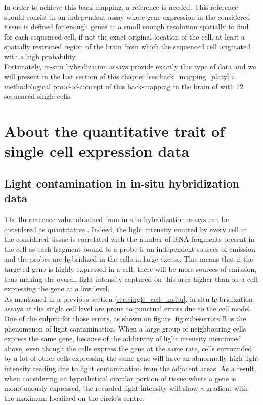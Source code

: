 	In order to achieve this back-mapping, a reference is needed. This reference should consist in an independent assay where gene expression in the considered tissue is defined for enough genes at a small enough resolution spatially to find for each sequenced cell, if not the exact original location of the cell, at least a spatially restricted region of the brain from which the sequenced cell originated with a high probability.\\
	
	Fortunately, in-situ hybridization assays provide exactly this type of data and we will present in the last section of this chapter \ref{sec:back_mapping_platy} a methodological proof-of-concept of this back-mapping in the brain of \platy{} with 72 sequenced single cells.

\section{About the quantitative trait of single cell expression data}\label{sec:quantitative_single_cell}
  \subsection*{Light contamination in in-situ hybridization data}
  The fluorescence value obtained from in-situ hybridization assays can be considered as quantitative \cite{dorresteijn90}. Indeed, the light intensity emitted by every cell in the considered tissue is correlated with the number of RNA fragments present in the cell as each fragment bound to a probe is an independent sources of emission and the probes are hybridized in the cells in large excess. This means that if the targeted gene is highly expressed in a cell, there will be more sources of emission, thus making the overall light intensity captured on this area higher than on a cell expressing the gene at a low level. \\
  
  As mentioned in a previous section \ref{sec:single_cell_insitu}, in-situ hybridization assays at the single cell level are prone to punctual errors due to the cell model. One of the culprit for those errors, as shown on figure \ref{fig:cubeserrors}B is the phenomenon of light contamination. When a large group of neighbouring cells express the same gene, because of the additivity of light intensity mentioned above, even though the cells express the gene at the same rate, cells surrounded by a lot of other cells expressing the same gene will have an abnormally high light intensity reading due to light contamination from the adjacent areas. As a result, when considering an hypothetical circular portion of tissue where a gene is monotonously expressed, the recorded light intensity will show a gradient with the maximum localized on the circle's centre.\\
  
